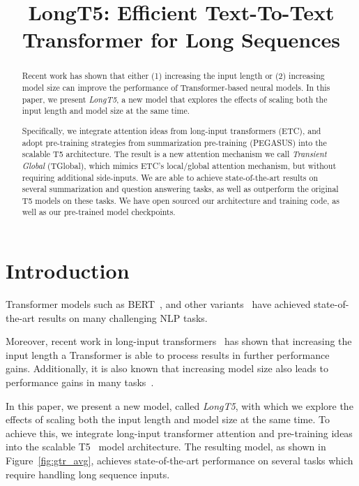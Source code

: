 \title{LongT5: Efficient Text-To-Text Transformer for Long Sequences}

\begin{abstract}
Recent work has shown that either (1) increasing the input length or (2) increasing model size can improve the performance of Transformer-based neural models. In this paper, we present {\em LongT5}, a new model that explores the effects of scaling both the input length and model size at the same time. 

Specifically, we integrate attention ideas from long-input transformers (ETC), and adopt pre-training strategies from summarization pre-training (PEGASUS) into the scalable T5 architecture. The result is a new attention mechanism we call {\em Transient Global} (TGlobal), which mimics ETC's local/global attention mechanism, but without requiring additional side-inputs. We are able to achieve state-of-the-art results on several summarization and question answering tasks, as well as outperform the original T5 models on these tasks. We have open sourced our architecture and training code, as well as our pre-trained model checkpoints.
\end{abstract}

\section{Introduction}

Transformer models such as BERT~\cite{devlin-etal-2019-bert}, and other variants~\cite{liu2019roberta,Radford2019LanguageMA,t5,lewis-etal-2020-bart} have achieved state-of-the-art results on many challenging NLP tasks. 

Moreover, recent work in long-input transformers~\cite{etc,zaheer2020,Beltagy2020Longformer,tay2021long} has shown that increasing the input length a Transformer is able to process results in further performance gains. Additionally, it is also known that increasing model size also leads to performance gains in many tasks~\cite{kaplan2020scaling}. 

In this paper, we present a new model, called {\em LongT5}, with which we explore the effects of scaling both the input length and model size at the same time. To achieve this, we integrate long-input transformer attention and pre-training ideas into the scalable T5~\cite{t5} model architecture. The resulting model, as shown in Figure~\ref{fig:gtr_avg}, achieves state-of-the-art performance on several tasks which require handling long sequence inputs.

